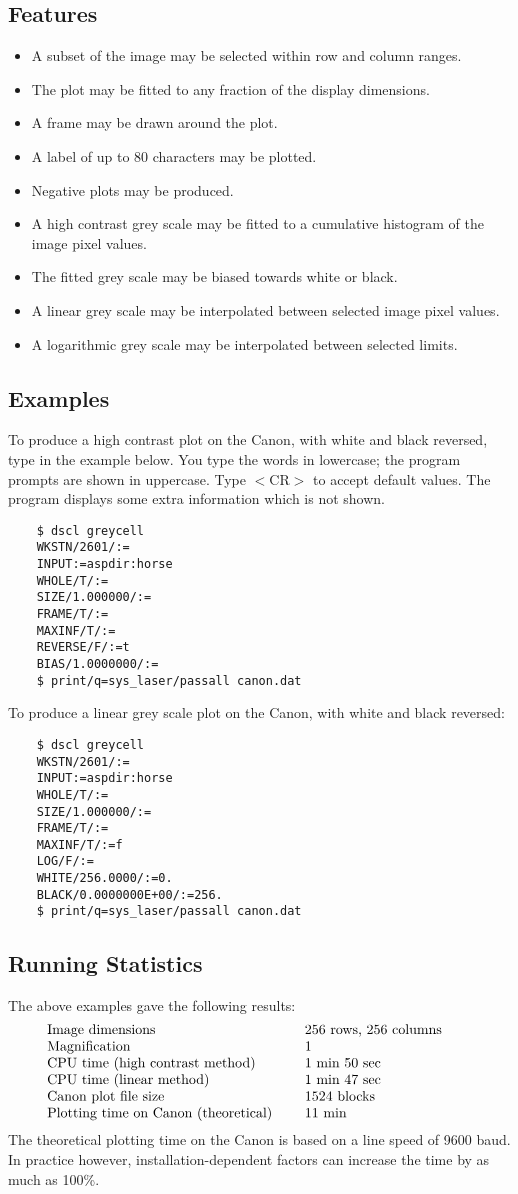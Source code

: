 \subsection {Features}
\begin{itemize}
\item A subset of the image may be selected within row and column ranges.
\item The plot may be fitted to any fraction of the display dimensions.
\item A frame may be drawn around the plot.
\item A label of up to 80 characters may be plotted.
\item Negative plots may be produced.
\item A high contrast grey scale may be fitted to a cumulative histogram of
 the image pixel values.
\item The fitted grey scale may be biased towards white or black.
\item A linear grey scale may be interpolated between selected image pixel
 values.
\item A logarithmic grey scale may be interpolated between selected limits.
\end{itemize}
\subsection {Examples}
To produce a high contrast plot on the Canon, with white and black reversed,
type in the example below.
You type the words in lowercase; the program prompts are shown in uppercase.
Type $<$CR$>$ to accept default values.
The program displays some extra information which is not shown.
\begin{verbatim}
    $ dscl greycell
    WKSTN/2601/:=
    INPUT:=aspdir:horse
    WHOLE/T/:=
    SIZE/1.000000/:=
    FRAME/T/:=
    MAXINF/T/:=
    REVERSE/F/:=t
    BIAS/1.0000000/:=
    $ print/q=sys_laser/passall canon.dat
\end{verbatim}
To produce a linear grey scale plot on the Canon, with white and black reversed:
\begin{verbatim}
    $ dscl greycell
    WKSTN/2601/:=
    INPUT:=aspdir:horse
    WHOLE/T/:=
    SIZE/1.000000/:=
    FRAME/T/:=
    MAXINF/T/:=f
    LOG/F/:=
    WHITE/256.0000/:=0.
    BLACK/0.0000000E+00/:=256.
    $ print/q=sys_laser/passall canon.dat
\end{verbatim}
\subsection {Running Statistics}
The above examples gave the following results:
$$\vbox{
\tabskip=2em
\halign to \hsize{#\hfil & #\hfil\cr
Image dimensions & 256 rows, 256 columns\cr
Magnification & 1\cr
CPU time (high contrast method) & 1 min 50 sec\cr
CPU time (linear method) & 1 min 47 sec\cr
Canon plot file size & 1524 blocks\cr
Plotting time on Canon (theoretical) & 11 min\cr
}}$$ 
The theoretical plotting time on the Canon is based on a line speed of 9600 
baud. In practice however, installation-dependent factors can increase the time 
by as much as 100\%.

